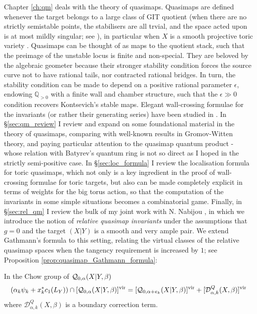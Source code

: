 Chapter \ref{ch:qm} deals with the theory of quasimaps. Quasimaps are defined whenever the target belongs to a large class of GIT quotient (when there are no strictly semistable points, the stabilisers are all trvial, and the space acted upon is at most mildly singular; see \cite{CFKM}), in particular when $X$ is a smooth projective toric variety \cite{CF-K}. Quasimaps can be thought of as maps to the quotient stack, such that the preimage of the unstable locus is finite and non-special. They are beloved by the algebraic geometer because their stronger stability condition forces the source curve not to have rational tails, nor contracted rational bridges. In turn, the stability condition can be made to depend on a positive rational parameter $\epsilon$, endowing $\mathbb Q_{>0}$ with a finite wall and chamber structure, such that the $\epsilon\gg0$ condition recovers Kontsevich's stable maps. Elegant wall-crossing formulae for the invariants (or rather their generating series) have been studied in \cites{TodaStableQuotient,CF-K-wallcrossing,CF-K-higher-genus,CF-K-MirrorSymmetry,CladerJandaRuan}. In \S \ref{sec:qm_review} I review and expand on some foundational material in the theory of quasimaps, comparing with well-known results in Gromov-Witten theory, and paying particular attention to the quasimap quantum product - whose relation with Batyrev's quantum ring is not so direct as I hoped in the strictly semi-positive case. In \S \ref{sec:loc_formula} I review the localisation formula for toric quasimaps, which not only is a key ingredient in the proof of wall-crossing formulae for toric targets, but also can be made completely explicit in terms of weights for the big torus action, so that the computation of the invariants in some simple situations becomes a combinatorial game. Finally, in \S \ref{sec:rel_qm} I review the bulk of my joint work with N. Nabijou \cite{BN}, in which we introduce the notion of \emph{relative quasimap invariants} under the assumptions that $g=0$ and the target $(X|Y)$ is a smooth and very ample pair. We extend Gathmann's formula \cite{Ga} to this setting, relating the virtual classes of the relative quasimap spaces when the tangency requirement is increased by $1$; see Proposition \ref{prop:quasimap_Gathmann_formula}:
\begin{prop*} In the Chow group of $\mathcal{Q}_{0,\alpha}(X|Y,\beta)$
 \begin{equation*} (\alpha_k \psi_k + x_k^*c_1(L_Y)) \cap [\mathcal{Q}_{0,\alpha}(X|Y,\beta)]^{\mathrm{vir}} = [\mathcal{Q}_{0,\alpha+e_k}(X|Y,\beta)]^{\mathrm{vir}} + [\mathcal{D}^Q_{\alpha,k}(X,\beta)]^{\mathrm{vir}} \end{equation*}
where $\mathcal{D}^Q_{\alpha,k}(X,\beta)$ is a boundary correction term. \end{prop*}
